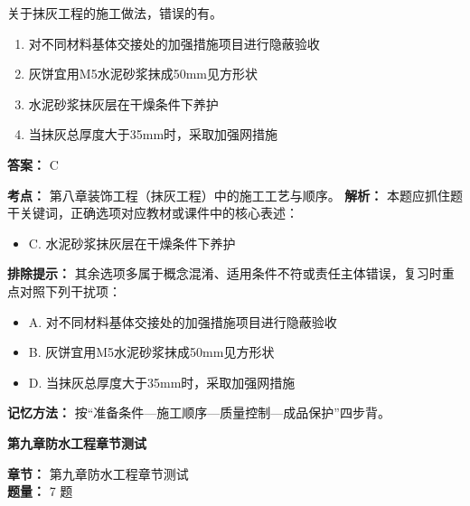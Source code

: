 \documentclass[UTF8,fontset=fandol,11pt]{ctexart}
\newcommand{\chaptertitle}[1]{\vspace{0.5em}\begin{tcolorbox}[enhanced,colback=deepblue,colframe=deepblue,arc=2mm,boxrule=0pt]\begin{center}\Large\bfseries\color{white}#1\end{center}\end{tcolorbox}\vspace{0.5em}}
\begin{document}
\begin{quizbox}[title={第 2 题}]
关于抹灰工程的施工做法，错误的有。\\
\begin{enumerate}[label=\Alph*.]
\item 对不同材料基体交接处的加强措施项目进行隐蔽验收
\item 灰饼宜用M5水泥砂浆抹成50mm见方形状
\item 水泥砂浆抹灰层在干燥条件下养护
\item 当抹灰总厚度大于35mm时，采取加强网措施
\end{enumerate}
\textbf{答案：} C
\vspace{0.25em}
\begin{answerbox}[title={考点解析}]
\textbf{考点：} 第八章装饰工程（抹灰工程）中的施工工艺与顺序。
\textbf{解析：} 本题应抓住题干关键词，正确选项对应教材或课件中的核心表述：
\begin{itemize}
\item C. 水泥砂浆抹灰层在干燥条件下养护
\end{itemize}
\textbf{排除提示：} 其余选项多属于概念混淆、适用条件不符或责任主体错误，复习时重点对照下列干扰项：
\begin{itemize}
\item A. 对不同材料基体交接处的加强措施项目进行隐蔽验收
\item B. 灰饼宜用M5水泥砂浆抹成50mm见方形状
\item D. 当抹灰总厚度大于35mm时，采取加强网措施
\end{itemize}
\textbf{记忆方法：} 按“准备条件—施工顺序—质量控制—成品保护”四步背。
\end{answerbox}
\end{quizbox}

\vspace{0.2em}

\chaptertitle{第九章防水工程章节测试}
\begin{mainbox}
\textbf{\textcolor{mainblue}{章节：}} 第九章防水工程章节测试\\
\textbf{\textcolor{answerred}{题量：}} 7 题
\end{mainbox}
\end{document}

